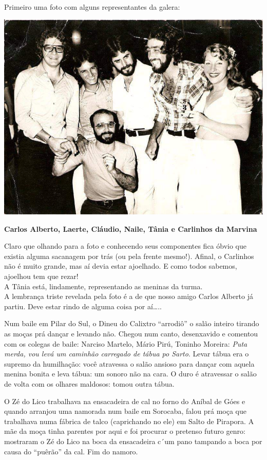 \documentclass[12pt,brazil,]{book}
\begin{document}
Primeiro uma foto com alguns representantes da galera:

\includegraphics{Imagens/TurmaSalto.jpeg}

\textbf{Carlos Alberto, Laerte, Cláudio, Naile, Tânia e Carlinhos da
Marvina}

Claro que olhando para a foto e conhecendo seus componentes fica óbvio
que existia alguma sacanagem por trás (ou pela frente mesmo!). Afinal, o
Carlinhos não é muito grande, mas aí devia estar ajoelhado. E como todos
sabemos, ajoelhou tem que rezar!\\
A Tânia está, lindamente, representando as meninas da turma.\\
A lembrança triste revelada pela foto é a de que nosso amigo Carlos
Alberto já partiu. Deve estar rindo de alguma coisa por aí\ldots{}..

Num baile em Pilar do Sul, o Dineu do Calixtro ``arrodiô'' o salão
inteiro tirando as moças prá dançar e levando não. Chegou num canto,
desenxavido e comentou com os colegas de baile: Narciso Martelo, Mário
Pirú, Toninho Moreira: \emph{Puta merda, vou levá um caminhão carregado
de tábua po Sarto}. Levar tábua era o supremo da humilhação: você
atravessa o salão ansioso para dançar com aquela menina bonita e leva
tábua: um sonoro não na cara. O duro é atravessar o salão de volta com
os olhares maldosos: tomou outra tábua.

O Zé do Lico trabalhava na ensacadeira de cal no forno do Aníbal de Góes
e quando arranjou uma namorada num baile em Sorocaba, falou prá moça que
trabalhava numa fábrica de talco (caprichando no ele) em Salto de
Pirapora. A mãe da moça tinha parentes por aqui e foi procurar o
pretenso futuro genro: mostraram o Zé do Lico na boca da ensacadeira
c´um pano tampando a boca por causa do ``puêrão'' da cal. Fim do namoro.
\end{document}
